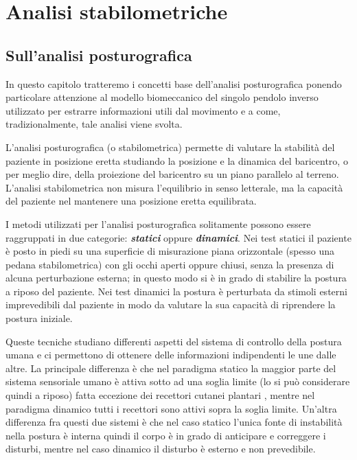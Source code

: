 \chapter{Analisi stabilometriche}
\label{cap:analisi_stabilometriche}

\section{Sull'analisi posturografica}
In questo capitolo tratteremo i concetti base dell'analisi posturografica ponendo particolare attenzione al modello biomeccanico del singolo pendolo inverso utilizzato per estrarre informazioni utili dal movimento e a come, tradizionalmente, tale analisi viene svolta.

L'analisi posturografica (o stabilometrica) permette di valutare la stabilità del paziente in posizione eretta studiando la posizione e la dinamica del baricentro, o per meglio dire, della proiezione del baricentro su un piano parallelo al terreno. L'analisi stabilometrica non misura l'equilibrio in senso letterale, ma la capacità del paziente nel mantenere una posizione eretta equilibrata.

I metodi utilizzati per l'analisi posturografica solitamente possono essere raggruppati in due categorie: {\bfseries\itshape statici} oppure {\bfseries\itshape dinamici}. Nei test statici il paziente è posto in piedi su una superficie di misurazione piana orizzontale (spesso una pedana stabilometrica) con gli occhi aperti oppure chiusi, senza la presenza di alcuna perturbazione esterna; in questo modo si è in grado di stabilire la postura a riposo del paziente. Nei test dinamici la postura è perturbata da stimoli esterni imprevedibili dal paziente in modo da valutare la sua capacità di riprendere la postura iniziale.

Queste tecniche studiano differenti aspetti del sistema di controllo della postura umana e ci permettono di ottenere delle informazioni indipendenti le une dalle altre. La principale differenza è che nel paradigma statico la maggior parte del sistema sensoriale umano è attiva sotto ad una soglia limite (lo si può considerare quindi a riposo) \cite{fitzpatrick93}\cite{konradson96} fatta eccezione dei recettori cutanei plantari \cite{kavounoudias98}\cite{wu97}, mentre nel paradigma dinamico tutti i recettori sono attivi sopra la soglia limite. Un'altra differenza fra questi due sistemi è che nel caso statico l'unica fonte di instabilità nella postura è interna quindi il corpo è in grado di anticipare e correggere i disturbi, mentre nel caso dinamico il disturbo è esterno e non prevedibile.

